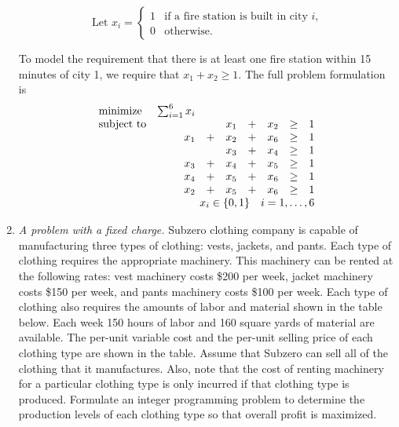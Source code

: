 \begin{enumerate}
\begin{solution}
  \bs
\begin{equation*}
\text{Let $x_i$} = 
\begin{cases}
1 & \text{if a fire station is built in city $i$,}\\
0 & \text{otherwise.}
\end{cases}
\end{equation*}

To model the requirement that there is at least one fire station within
15 minutes of city 1, we require that $x_1 + x_2 \geq 1$. The full
problem formulation is
\[
\begin{array}{lrrrrrrl}
\textrm{minimize} & \sum_{i=1}^{6} x_i & & & & & & \\
\textrm{subject to} & & & x_1 & + & x_2 & \geq & 1 \\
 & x_1 & + & x_2 & + & x_6 & \geq & 1 \\
 &     &   & x_3 & + & x_4 & \geq & 1 \\
 & x_3 & + & x_4 & + & x_5 & \geq & 1 \\
 & x_4 & + & x_5 & + & x_6 & \geq & 1 \\
 & x_2 & + & x_5 & + & x_6 & \geq & 1 \\
 \multicolumn{8}{r}{x_i \in \{0,1\} \quad i = 1,\ldots,6}
\end{array}
\]
\end{solution}

\item \emph{A problem with a fixed charge.}
Subzero clothing company is capable of manufacturing three types of clothing:
vests, jackets, and pants. Each type of clothing requires the appropriate
machinery. This machinery can be rented at the following rates: vest machinery
costs \$200 per week, jacket machinery costs \$150 per week, and pants
machinery costs \$100 per week. Each type of clothing also requires the
amounts of labor and material shown in the table below. Each week 150 hours
of labor and 160 square yards of material are available. The per-unit variable
cost and the per-unit selling price of each clothing type are shown in the table. 
Assume that Subzero can sell all of the clothing that it manufactures.
Also, note that the cost of renting machinery for a particular clothing
type is only incurred if that clothing type is produced.
Formulate an integer programming problem to determine the production levels
of each clothing type so that overall profit is maximized.


\end{enumerate}
